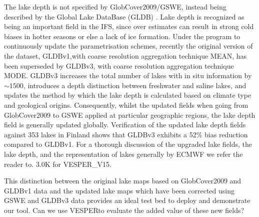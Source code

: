 \documentclass[hess, twostagejnl]{copernicus}
\providecommand{\DIFadd}[1]{{\protect\color{blue} \sf #1}} %
\providecommand{\DIFdel}[1]{{\protect\color{red} \scriptsize #1}} %
\providecommand{\DIFaddbegin}{} %
\providecommand{\DIFaddend}{} %
\providecommand{\DIFdelbegin}{} %
\providecommand{\DIFdelend}{} %
\begin{document}
\DIFdel{The lake depth is not specified by GlobCover2009/GSWE, instead being described by the Global Lake DataBase (GLDB) \cite{Kourzeneva2012}. Lake depth is recognized as being an important field in the IFS, since over estimates can result in strong cold biases in hotter seasons or else a lack of ice formation. Under the program to continuously update the parametrisation schemes, recently the original version of the dataset, GLDBv1,with coarse resolution aggregation technique MEAN, has been superseded by GLDBv3\cite{Choulga2014}, with coarse resolution aggregation technique MODE. GLDBv3 increases the total number of lakes with in situ information by $\sim1500$, introduces a depth distinction between freshwater and saline lakes, and updates the method by which the lake depth is calculated based on climate type and geological origins. Consequently, whilst the updated fields when going from GlobCover2009 to GSWE applied at particular geographic regions, the lake depth field is generally updated globally. Verification of the updated lake depth fields against 353 lakes in Finland shows that GLDBv3 exhibits a 52$\%$ bias reduction compared to GLDBv1\cite{Choulga2019}. For a thorough discussion of the upgraded lake fields, the lake depth, and the representation of lakes generally by ECMWF we refer the reader to\cite{Choulga2019,Boussetta2021}. }\DIFdelend \DIFaddbegin \DIFadd{3.0K for VESPER\_V15. }\DIFaddend \newline 

 \DIFdelbegin %
\DIFdel{This distinction between the original lake maps based on GlobCover2009 and GLDBv1 data and the updated lake maps which have been corrected using GSWE and GLDBv3 data provides an ideal test bed to deploy and demonstrate our tool. Can we use VESPERto evaluate the added value of these new fields? 
}%

\end{document}
